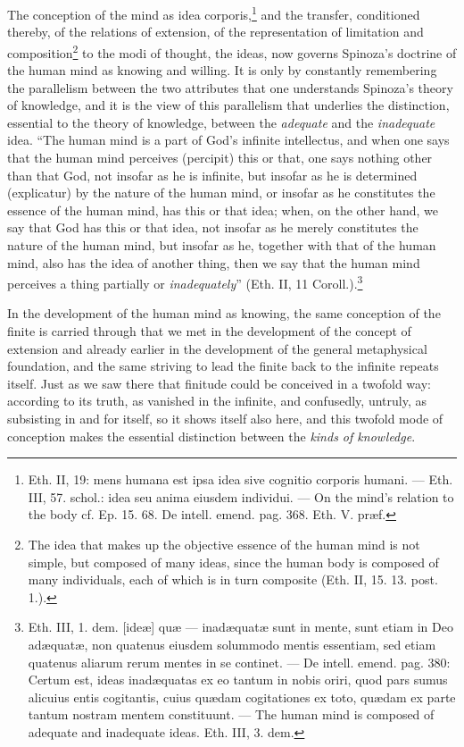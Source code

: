 \documentclass[12pt,a4paper,openany]{book}
\newcommand{\opage}[1]{\marginnote{\footnotesize\textit{[#1]}}}
\begin{document}
\opage{87}\setcounter{footnote}{0}The conception of the mind as idea corporis,\footnote{Eth. II, 19:
mens humana est ipsa idea sive cognitio corporis humani. ---
Eth. III, 57. schol.: idea seu anima eiusdem individui. --- On
the mind's relation to the body cf. Ep. 15. 68. De intell. emend.
pag. 368. Eth. V. præf.} and the transfer, conditioned thereby, %
of the relations of extension, of the representation of limitation
and composition\footnote{The idea that makes up the objective
essence of the human mind is not simple, but
composed of many ideas, since the human body
is composed of many individuals, each of which is in turn
composite (Eth. II, 15. 13. post. 1.).} to the modi of thought,
the ideas, now governs Spinoza's doctrine of the human
mind as knowing and willing. It is only by constantly
remembering the parallelism between the two attributes that one understands
Spinoza's theory of knowledge, and it is the view of this parallelism that
underlies the distinction, essential to the theory of knowledge,
between the \emph{adequate} and the \emph{inadequate} idea.
``The human mind is a part of God's infinite
intellectus, and when one says that the human mind
perceives (percipit) this or that, one says nothing
other than that God, not insofar as he is infinite, but
insofar as he is determined (explicatur) by the nature of the human
mind, or insofar as he constitutes the essence of the
human mind, has this or that idea; when, on the other hand,
we say that God has this or that idea, not insofar
as he merely constitutes the nature of the human mind, but
insofar as he, together with that of the human mind, also has
the idea of another thing, then we say that the human mind
perceives a thing partially or \emph{inadequately}'' (Eth. II, 11
Coroll.).\footnote{Eth. III, 1. dem. [ideæ] quæ --- inadæquatæ
sunt in mente, sunt etiam in Deo adæquatæ, non quatenus
eiusdem solummodo mentis essentiam, sed etiam quatenus
aliarum rerum mentes in se continet. --- De intell. emend.
pag. 380: Certum est, ideas inadæquatas ex eo tantum in nobis
oriri, quod pars sumus alicuius entis cogitantis, cuius
quædam cogitationes ex toto, quædam ex parte tantum nostram
mentem constituunt. --- The human mind is composed of
adequate and inadequate ideas. Eth. III, 3. dem.}

\opage{88}\setcounter{footnote}{0}In the development of the human mind as knowing,
the same conception of the finite is carried through that we
met in the development of the concept of extension and already
earlier in the development of the general metaphysical
foundation, and the same striving to lead the finite
back to the infinite repeats itself. Just as we saw there
that finitude could be conceived in a twofold way: according to its
truth, as vanished in the infinite, and confusedly, untruly,
as subsisting in and for itself, so it shows itself also
here, and this twofold mode of conception makes the essential
distinction between the \emph{kinds of knowledge}.
\end{document}
